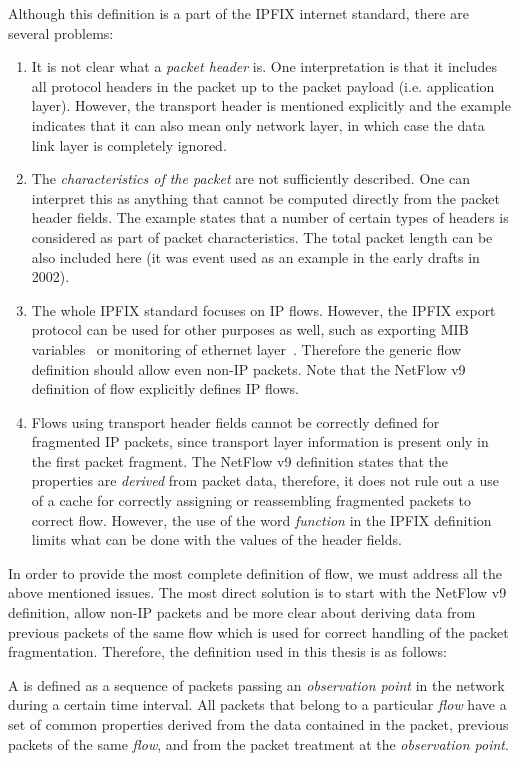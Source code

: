 Although this definition is a part of the IPFIX internet standard, there are several problems:
\begin{enumerate}
	\item It is not clear what a \emph{packet header} is. One interpretation is that it includes all protocol headers in the packet up to the packet payload (i.e. application layer). However, the transport header is mentioned explicitly and the example indicates that it can also mean only network layer, in which case the data link layer is completely ignored.
	\item The \emph{characteristics of the packet} are not sufficiently described. One can interpret this as anything that cannot be computed directly from the packet header fields. The example states that a number of certain types of headers is considered as part of packet characteristics. The total packet length can be also included here (it was event used as an example in the early drafts in 2002).
	\item The whole IPFIX standard focuses on IP flows. However, the IPFIX export protocol can be used for other purposes as well, such as exporting MIB variables~\cite{rfc6615} or monitoring of ethernet layer~\cite{Hofstede-2011-Flow}. Therefore the generic flow definition should allow even non-IP packets. Note that the NetFlow v9 definition of flow explicitly defines IP flows.
	\item Flows using transport header fields cannot be correctly defined for fragmented IP packets, since transport layer information is present only in the first packet fragment. The NetFlow v9 definition states that the properties are \emph{derived} from packet data, therefore, it does not rule out a use of a cache for correctly assigning or reassembling fragmented packets to correct flow. However, the use of the word \emph{function} in the IPFIX definition limits what can be done with the values of the header fields.
\end{enumerate}

In order to provide the most complete definition of flow, we must address all the above mentioned issues. The most direct solution is to start with the NetFlow v9 definition, allow non-IP packets and be more clear about deriving data from previous packets of the same flow which is used for correct handling of the packet fragmentation. Therefore, the definition used in this thesis is as follows:

\begin{definition}\label{def:flow}

    A \emph{} is defined as a sequence of packets passing an \emph{observation point}
    in the network during a certain time interval. All packets that belong
    to a particular \emph{flow} have a set of common properties derived from
    the data contained in the packet, previous packets of the same \emph{flow},
    and from the packet treatment at the \emph{observation point}.

\end{definition}

